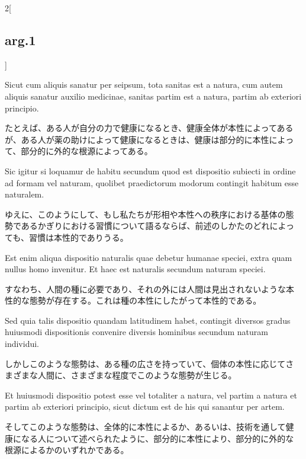 \documentclass[paper=a4paper,fontsize=10pt,jafontsize=9pt,titlepage]{jlreq}
\begin{document}
\begin{paracol}{2}[\subsection{arg.1}]
\switchcolumn*

Sicut cum aliquis sanatur per seipsum, tota sanitas est a natura, cum
autem aliquis sanatur auxilio medicinae, sanitas partim est a natura,
partim ab exteriori principio.

\switchcolumn

たとえば、ある人が自分の力で健康になるとき、健康全体が本性によってある
が、ある人が薬の助けによって健康になるときは、健康は部分的に本性によっ
て、部分的に外的な根源によってある。

\switchcolumn*

Sic igitur si loquamur de habitu secundum quod est dispositio subiecti
in ordine ad formam vel naturam, quolibet praedictorum modorum
contingit habitum esse naturalem.

\switchcolumn

ゆえに、このようにして、もし私たちが形相や本性への秩序における基体の態
勢であるかぎりにおける習慣について語るならば、前述のしかたのどれによっ
ても、習慣は本性的でありうる。

\switchcolumn*

Est enim aliqua dispositio naturalis quae debetur humanae speciei,
extra quam nullus homo invenitur. Et haec est naturalis secundum
naturam speciei.

\switchcolumn

すなわち、人間の種に必要であり、それの外には人間は見出されないような本
性的な態勢が存在する。これは種の本性にしたがって本性的である。

\switchcolumn*

Sed quia talis dispositio quandam latitudinem habet, contingit
diversos gradus huiusmodi dispositionis convenire diversis hominibus
secundum naturam individui.

\switchcolumn

しかしこのような態勢は、ある種の広さを持っていて、個体の本性に応じてさ
まざまな人間に、さまざまな程度でこのような態勢が生じる。

\switchcolumn*

Et huiusmodi dispositio potest esse vel totaliter a natura, vel partim
a natura et partim ab exteriori principio, sicut dictum est de his qui
sanantur per artem.

\switchcolumn

そしてこのような態勢は、全体的に本性によるか、あるいは、技術を通して健
康になる人について述べられたように、部分的に本性により、部分的に外的な
根源によるかのいずれかである。

\switchcolumn*


\end{paracol}
\end{document}
